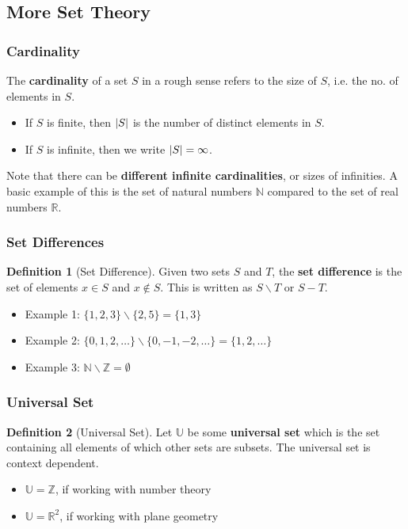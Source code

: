 \documentclass[12pt]{article}
\DeclarePairedDelimiter\abs{\lvert}{\rvert}
\newcommand{\Z}{\mathbb{Z}}
\newcommand{\N}{\mathbb{N}}
\newcommand{\R}{\mathbb{R}}
\newcommand{\U}{\mathbb{U}}
\theoremstyle{definition}
\newtheorem{definition}{Definition}
\begin{document}
            \subsection{More Set Theory}
            \subsubsection{Cardinality}
            The \textbf{cardinality} of a set $S$ in a rough sense refers to the size of $S$, i.e. the no. of elements in
            $S$.
            \begin{itemize}
                \item If $S$ is finite, then $\abs{S}$ is the number of distinct elements in $S$.
                \item If $S$ is infinite, then we write $\abs{S} = \infty$. 
            \end{itemize}
            Note that there can be \textbf{different infinite cardinalities}, or sizes of infinities. A basic example of this
            is the set of natural numbers $\N$ compared to the set of real numbers $\R$.

            \subsubsection{Set Differences}
            \begin{definition}[Set Difference]
                \label{def:set-difference}
                Given two sets $S$ and $T$, the \textbf{set difference} is the set of elements $x \in S$ and $x \notin S$.
                This is written as $S \backslash T$ or $S - T$.
            \end{definition}
            \begin{itemize}
                \item Example 1: $\{1,2,3\}\backslash \{2, 5\} = \{1, 3\}$
                \item Example 2: $\{0, 1, 2, \dots\} \backslash \{0, -1, -2, \dots\} = \{1, 2, \dots\}$
                \item Example 3: $\N \backslash \Z = \emptyset$
            \end{itemize}

            \subsubsection{Universal Set}
            \begin{definition}[Universal Set]
                \label{def:universal-set}
                Let $\U$ be some \textbf{universal set} which is the set containing all elements of which other sets are
                subsets. The universal set is context dependent.
            \end{definition}
            \begin{itemize}
                \item $\U = \Z$, if working with number theory
                \item $\U = \R^2$, if working with plane geometry
            \end{itemize}
\end{document}
